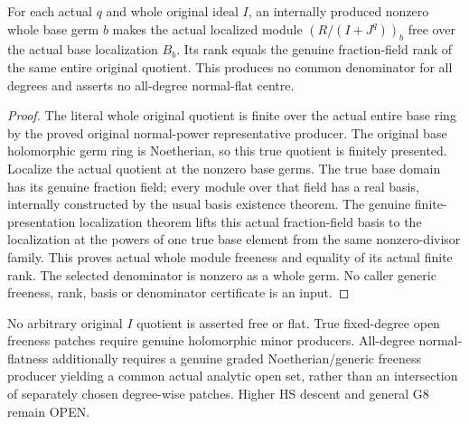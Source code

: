 \begin{theorem}
\label{hir:relative-normal-ideal-actual-fixed-degree-free-localization}
\leanok
For each actual $q$ and whole original ideal $I$, an internally produced
nonzero whole base germ $b$ makes the actual localized module
$(R/(I+J^q))_b$ free over the actual base localization $B_b$. Its rank equals
the genuine fraction-field rank of the same entire original quotient.
This produces no common denominator for all degrees and asserts no all-degree
normal-flat centre.
\end{theorem}
\begin{proof}
The literal whole original quotient is finite over the actual entire base
ring by the proved original normal-power representative producer. The
original base holomorphic germ ring is Noetherian, so this true quotient is
finitely presented. Localize the actual quotient at the nonzero base germs.
The true base domain has its genuine fraction field; every module over
that field has a real basis, internally constructed by the usual basis
existence theorem. The genuine finite-presentation localization theorem
lifts this actual fraction-field basis to the localization at the powers
of one true base element from the same nonzero-divisor family. This proves
actual whole module freeness and equality of its actual finite rank.
The selected denominator is nonzero as a whole germ. No caller generic
freeness, rank, basis or denominator certificate is an input.
\end{proof}

\begin{remark}
No arbitrary original $I$ quotient is asserted free or flat. True fixed-degree
open freeness patches require genuine holomorphic minor producers. All-degree
normal-flatness additionally requires a genuine graded Noetherian/generic
freeness producer yielding a common actual analytic open set, rather than an
intersection of separately chosen degree-wise patches. Higher HS descent and
general G8 remain OPEN.
\end{remark}
